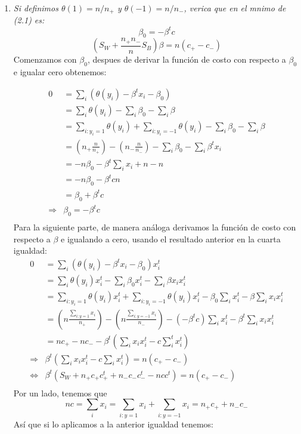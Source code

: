 \documentclass[paper=letter, fontsize=11pt]{scrartcl}
\numberwithin{equation}{section} %
\numberwithin{figure}{section} %
\numberwithin{table}{section} %
\begin{document}
\begin{enumerate}
\item \textit{Si definimos $\theta(1) = n/n_+$ y $\theta (-1) = n/n_-$, verica que en el mnimo de (2.1) es:}
\begin{equation*}
\beta_0=-\beta^tc
\end{equation*}
\begin{equation}
(S_W+\frac{n_+n_-}{n}S_B)\beta=n(c_+-c_-)
\end{equation}
Comenzamos con $\beta_0$, despues de derivar la función de costo con respecto a $\beta_0$ e igualar  cero obtenemos:

\begin{equation*}
\begin{split}
0 & =  \sum_i (\theta(y_i)- \beta^tx_i-\beta_0) \\
 & =  \sum_i\theta(y_i) - \sum_i\beta_0 -\sum_i\beta\\
 & = \sum_{i:y_i=1}\theta(y_i) + \sum_{i:y_i=-1}\theta(y_i) - \sum_i\beta_0 -\sum_i\beta\\
 & = (n_+ \frac{n}{n_+}) - (n_- \frac{n}{n_-}) - \sum_i\beta_0 - \sum_i\beta^t x_i \\
 & = -n\beta_0 - \beta^t \sum_ix_i +n -n\\
 &= -n\beta_0 - \beta^tcn\\
 & = \beta_0 +\beta^tc \\
\Rightarrow  & \beta_0= -\beta^tc  \\
\end{split}
\end{equation*}
Para la siguiente parte, de manera análoga derivamos la función de costo con respecto a $\beta$ e igualando a cero, usando el resultado anterior en la cuarta igualdad: 
\begin{equation*}
\begin{split}
0 & =  \sum_i (\theta(y_i)- \beta^tx_i-\beta_0)x_i^t \\
 & =  \sum_i\theta(y_i)x_i^t - \sum_i\beta_0x_i^t -\sum_i\beta x_ix_i^t\\
 & = \sum_{i:y_i=1}\theta(y_i)x_i^t + \sum_{i:y_i=-1}\theta(y_i)x_i^t - \beta_0\sum_ix_i^t -\beta \sum_ix_ix_i^t\\
 & = (n \frac{\sum_{i:y=1} x_i}{n_+}) - (n \frac{\sum_{i:y=-1}x_i}{n_-}) - (-\beta^tc)\sum_ix_i^t - \beta^t\sum_ix_i x_i^t \\
 & = nc_+ - nc_- - \beta^t( \sum_ix_ix_i^t-c\sum^t_ix_i^t) \\
 \Rightarrow & \beta^t( \sum_ix_ix_i^t-c\sum_ix_i^t) = n(c_+-c_-)\\
 \Longleftrightarrow &  \beta^t( S_W +n_+ c_+c_+^t +n_-c_-c_-^t -ncc^t ) = n(c_+-c_-) \\
\end{split}
\end{equation*}
Por un lado, tenemos que 
\[  nc = \sum_i x_i = \sum_{i:y=1}x_i +\sum_{i:y=-1}x_i = n_+c_+ + n_-c_- \]
Así que si lo aplicamos a la anterior igualdad tenemos:


\end{enumerate}
\end{document}
